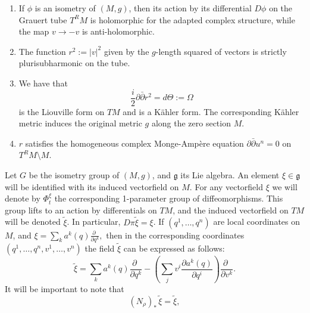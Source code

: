 \documentclass[12pt,reqno]{amsart}\usepackage{amssymb,amsmath,amscd,epsfig,amsthm,enumerate,import,eufrak}
\theoremstyle{definition}
\theoremstyle{remark}
\numberwithin{equation}{section}
\theoremstyle{plain}
\theoremstyle{definition}
\def \vs {\vskip 2mm}
\def \and {\; \text{and}\;}
\theoremstyle{remark}
\numberwithin{theorem}{section}
\begin{document}
\begin{enumerate}
\item If $\phi$ is an isometry of $(M, g)$, then its action by its differential $D\phi$ on the Grauert tube $T^RM$ is holomorphic for the adapted complex structure, while the map $v \to -v$ is anti-holomorphic.
\vs
\item The function $r^2 := |v|^2$ given by the $g$-length squared of vectors is strictly plurisubharmonic on the tube.
\vs
\item We have that  \begin{equation} \label{eqn:Liouville}
	\frac{i}2 \partial \bar{\partial} r^2 = d\Theta := \Omega
\end{equation}
%
is the Liouville form on $TM$ and is a K\"ahler form. The corresponding K\"ahler metric induces the original metric $g$ along the zero section $M$. 
\vs
%
%
%
%

%
%
%
%
\vs
\item $r$ satisfies the homogeneous complex Monge-Amp\`ere equation $\partial \bar{\partial} u^n = 0$ on $T^RM \setminus M$.
\end{enumerate}
\vs
Let $G$ be the isometry group of $(M, g)$, and $\mathfrak{g}$ its Lie algebra. An element $\xi \in \mathfrak{g}$ will be identified with its induced vectorfield on $M$. For any vectorfield $\xi$ we will denote by $\Phi^{\xi}_t$ the corresponding 1-parameter group of diffeomorphisms. This group lifts to an action by differentials on $TM$, and the induced vectorfield on $TM$ will be denoted $\tilde{\xi}$. In particular, $D\pi\tilde{\xi} = \xi$. If $(q^1, \ldots, q^n)$ are local coordinates on $M$, and $\xi = \sum_k a^k(q) \frac{\partial \,\,}{\partial q^k},$ then in the corresponding coordinates $(q^1, \ldots, q^n, v^1, \ldots, v^n)$ the field $\tilde{\xi}$ can be expressed as follows:
%
\[
	\tilde{\xi} = \sum_k a^k(q) \frac{\partial \,\,}{\partial q^k} - \left(\sum_ j v^i \frac{\partial a^k(q)}{\partial q^i}\right) \frac{\partial \,\,}{\partial v^k}.
\]
%
It will be important to note that 
%
\begin{equation} \label{eqn:scale}
	(N_{\rho})_* \, \tilde{\xi} = \tilde{\xi},
\end{equation}
\end{document}
